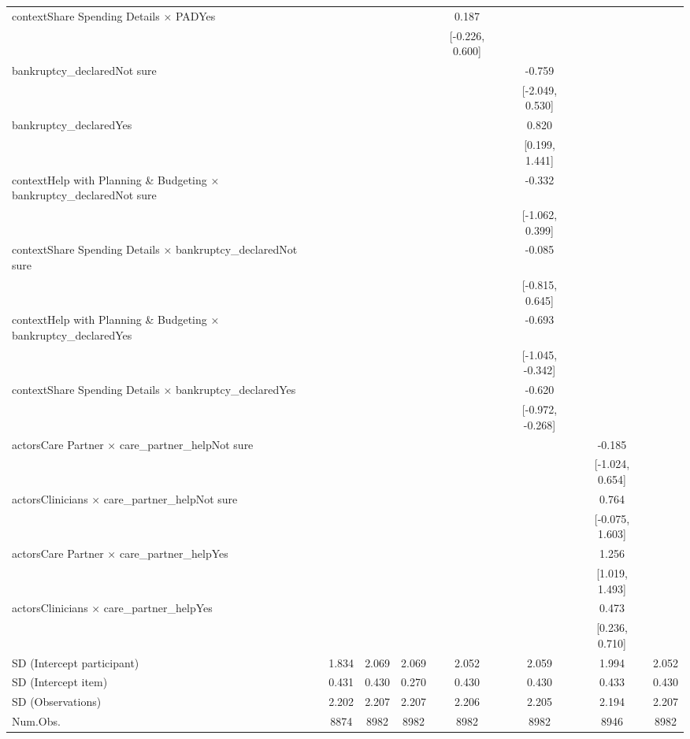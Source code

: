\begin{tiny}
\begin{xltabular}{\textwidth}{lccccccc}
contextShare Spending Details × PADYes &  &  &  & 0.187 &  &  &  \\ 
 &  &  &  & [-0.226, 0.600] &  &  &  \\ 
bankruptcy\_declaredNot sure &  &  &  &  & -0.759 &  &  \\ 
 &  &  &  &  & [-2.049, 0.530] &  &  \\ 
bankruptcy\_declaredYes &  &  &  &  & 0.820 &  &  \\ 
 &  &  &  &  & [0.199, 1.441] &  &  \\ 
contextHelp with Planning \& Budgeting × bankruptcy\_declaredNot sure &  &  &  &  & -0.332 &  &  \\ 
 &  &  &  &  & [-1.062, 0.399] &  &  \\ 
contextShare Spending Details × bankruptcy\_declaredNot sure &  &  &  &  & -0.085 &  &  \\ 
 &  &  &  &  & [-0.815, 0.645] &  &  \\ 
contextHelp with Planning \& Budgeting × bankruptcy\_declaredYes &  &  &  &  & -0.693 &  &  \\ 
 &  &  &  &  & [-1.045, -0.342] &  &  \\ 
contextShare Spending Details × bankruptcy\_declaredYes &  &  &  &  & -0.620 &  &  \\ 
 &  &  &  &  & [-0.972, -0.268] &  &  \\ 
actorsCare Partner × care\_partner\_helpNot sure &  &  &  &  &  & -0.185 &  \\ 
 &  &  &  &  &  & [-1.024, 0.654] &  \\ 
actorsClinicians × care\_partner\_helpNot sure &  &  &  &  &  & 0.764 &  \\ 
 &  &  &  &  &  & [-0.075, 1.603] &  \\ 
actorsCare Partner × care\_partner\_helpYes &  &  &  &  &  & 1.256 &  \\ 
 &  &  &  &  &  & [1.019, 1.493] &  \\ 
actorsClinicians × care\_partner\_helpYes &  &  &  &  &  & 0.473 &  \\ 
 &  &  &  &  &  & [0.236, 0.710] &  \\ 
SD (Intercept participant) & 1.834 & 2.069 & 2.069 & 2.052 & 2.059 & 1.994 & 2.052 \\ 
SD (Intercept item) & 0.431 & 0.430 & 0.270 & 0.430 & 0.430 & 0.433 & 0.430 \\ 
{SD (Observations)} & {2.202} & {2.207} & {2.207} & {2.206} & {2.205} & {2.194} & {2.207} \\ 
Num.Obs. & 8874 & 8982 & 8982 & 8982 & 8982 & 8946 & 8982 \\ 

\end{xltabular}
\end{tiny}
